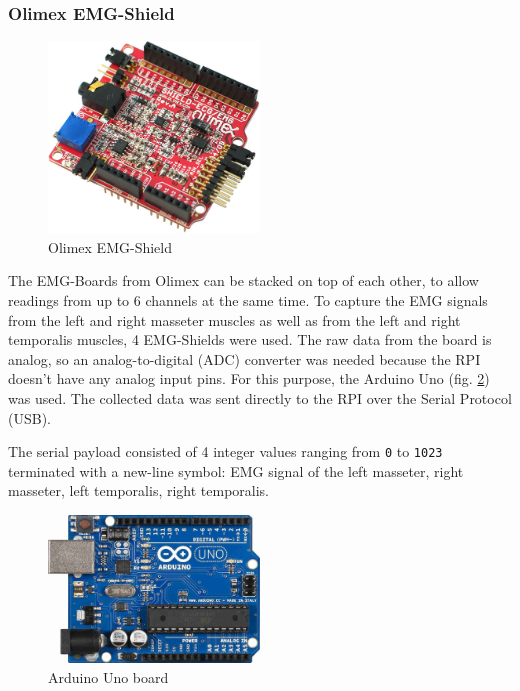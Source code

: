 \subsubsection{Olimex EMG-Shield}
\label{subsub:emg}

\begin{figure}[h!]
\centering
\includegraphics[width=0.5\textwidth]{src/media/hardware/emg.jpg}
\caption{Olimex EMG-Shield}
\label{image:emg}
\end{figure}

The EMG-Boards from Olimex can be stacked on top of each other, to allow readings from up to 6 channels at the same time. To capture the EMG signals from the left and right masseter muscles as well as from the left and right temporalis muscles, 4 EMG-Shields were used. The raw data from the board is analog, so an analog-to-digital (ADC) converter was needed because the RPI doesn't have any analog input pins. For this purpose, the Arduino Uno (fig. \ref{image:arduino}) was used. The collected data was sent directly to the RPI over the Serial Protocol (USB).

The serial payload consisted of 4 integer values ranging from \texttt{0} to \texttt{1023} terminated with a new-line symbol: EMG signal of the left masseter, right masseter, left temporalis, right temporalis.


\begin{figure}[h!]
\centering
\includegraphics[width=0.5\textwidth]{src/media/hardware/arduino-uno.jpg}
\caption{Arduino Uno board}
\label{image:arduino}
\end{figure}

